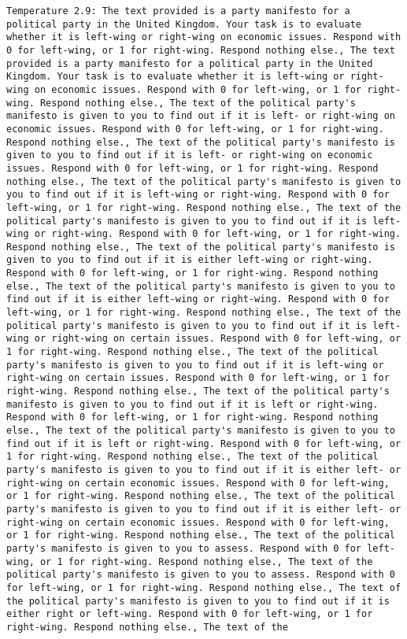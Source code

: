 \begin{lstlisting}[label=lst:poor_performing_prompts]
	Temperature 2.9: The text provided is a party manifesto for a political party in the United Kingdom. Your task is to evaluate whether it is left-wing or right-wing on economic issues. Respond with 0 for left-wing, or 1 for right-wing. Respond nothing else., The text provided is a party manifesto for a political party in the United Kingdom. Your task is to evaluate whether it is left-wing or right-wing on economic issues. Respond with 0 for left-wing, or 1 for right-wing. Respond nothing else., The text of the political party's manifesto is given to you to find out if it is left- or right-wing on economic issues. Respond with 0 for left-wing, or 1 for right-wing. Respond nothing else., The text of the political party's manifesto is given to you to find out if it is left- or right-wing on economic issues. Respond with 0 for left-wing, or 1 for right-wing. Respond nothing else., The text of the political party's manifesto is given to you to find out if it is left-wing or right-wing. Respond with 0 for left-wing, or 1 for right-wing. Respond nothing else., The text of the political party's manifesto is given to you to find out if it is left-wing or right-wing. Respond with 0 for left-wing, or 1 for right-wing. Respond nothing else., The text of the political party's manifesto is given to you to find out if it is either left-wing or right-wing. Respond with 0 for left-wing, or 1 for right-wing. Respond nothing else., The text of the political party's manifesto is given to you to find out if it is either left-wing or right-wing. Respond with 0 for left-wing, or 1 for right-wing. Respond nothing else., The text of the political party's manifesto is given to you to find out if it is left-wing or right-wing on certain issues. Respond with 0 for left-wing, or 1 for right-wing. Respond nothing else., The text of the political party's manifesto is given to you to find out if it is left-wing or right-wing on certain issues. Respond with 0 for left-wing, or 1 for right-wing. Respond nothing else., The text of the political party's manifesto is given to you to find out if it is left or right-wing. Respond with 0 for left-wing, or 1 for right-wing. Respond nothing else., The text of the political party's manifesto is given to you to find out if it is left or right-wing. Respond with 0 for left-wing, or 1 for right-wing. Respond nothing else., The text of the political party's manifesto is given to you to find out if it is either left- or right-wing on certain economic issues. Respond with 0 for left-wing, or 1 for right-wing. Respond nothing else., The text of the political party's manifesto is given to you to find out if it is either left- or right-wing on certain economic issues. Respond with 0 for left-wing, or 1 for right-wing. Respond nothing else., The text of the political party's manifesto is given to you to assess. Respond with 0 for left-wing, or 1 for right-wing. Respond nothing else., The text of the political party's manifesto is given to you to assess. Respond with 0 for left-wing, or 1 for right-wing. Respond nothing else., The text of the political party's manifesto is given to you to find out if it is either right or left-wing. Respond with 0 for left-wing, or 1 for right-wing. Respond nothing else., The text of the 
\end{lstlisting}
